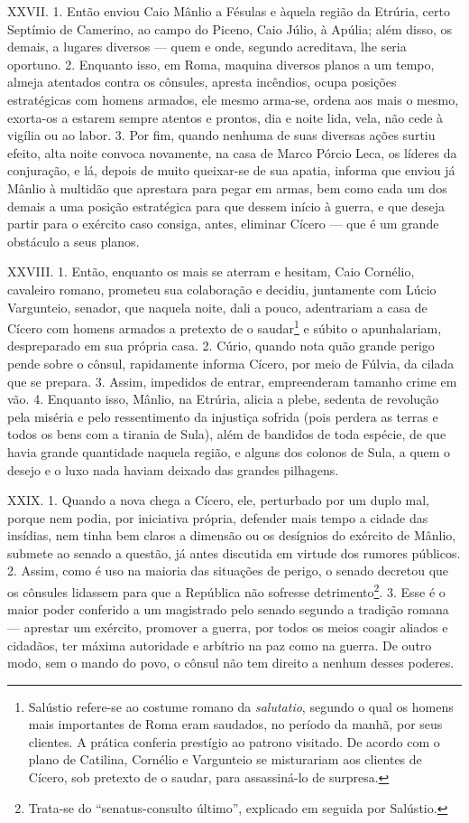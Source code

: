 XXVII. 1. Então enviou Caio Mânlio a Fésulas e àquela região da Etrúria, certo
Septímio de Camerino, ao campo do Piceno, Caio Júlio, à Apúlia; além disso, os
demais, a lugares diversos --- quem e onde, segundo acreditava, lhe seria
oportuno. 2. Enquanto isso, em Roma, maquina diversos planos a um tempo, almeja
atentados contra os cônsules, apresta incêndios, ocupa posições estratégicas
com homens armados, ele mesmo arma-se, ordena aos mais o mesmo, exorta-os a
estarem sempre atentos e prontos, dia e noite lida, vela, não cede à vigília ou
ao labor. 3. Por fim, quando nenhuma de suas diversas ações surtiu efeito, alta
noite convoca novamente, na casa de Marco Pórcio Leca, os líderes da
conjuração, e lá, depois de muito queixar-se de sua apatia, informa que enviou
já Mânlio à multidão que aprestara para pegar em armas, bem como cada um dos
demais a uma posição estratégica para que dessem início à guerra, e que deseja
partir para o exército caso consiga, antes, eliminar Cícero --- que  é um
grande obstáculo a seus planos.

XXVIII. 1. Então, enquanto os mais se aterram e hesitam, Caio Cornélio,
cavaleiro romano, prometeu sua colaboração e decidiu, juntamente com Lúcio
Vargunteio, senador, que naquela noite, dali a pouco, adentrariam a casa de
Cícero com homens armados a pretexto de o saudar\footnote{Salústio refere-se ao
costume romano da \emph{salutatio}, segundo o qual os homens mais importantes
de Roma eram saudados, no período da manhã, por seus clientes. A prática
conferia prestígio ao patrono visitado. De acordo com o plano de Catilina,
Cornélio e Vargunteio se misturariam aos clientes de Cícero, sob pretexto de o
saudar, para assassiná-lo de surpresa.} e súbito o apunhalariam, despreparado
em sua própria casa. 2. Cúrio, quando nota quão grande perigo pende sobre o
cônsul, rapidamente informa Cícero, por meio de Fúlvia, da cilada que se
prepara. 3. Assim, impedidos de entrar, empreenderam tamanho crime em vão. 4.
Enquanto isso, Mânlio, na Etrúria, alicia a plebe, sedenta de revolução pela
miséria e pelo ressentimento da injustiça sofrida (pois perdera as terras e
todos os bens com a tirania de Sula), além de bandidos de toda espécie, de que
havia grande quantidade naquela região, e alguns dos colonos de Sula, a quem o
desejo e o luxo nada haviam deixado das grandes pilhagens.

XXIX. 1. Quando a nova chega a Cícero, ele, perturbado por um duplo mal, porque
nem podia, por iniciativa própria, defender mais tempo a cidade das insídias,
nem tinha bem claros a dimensão ou os desígnios do exército de Mânlio, submete
ao senado a questão, já antes discutida em virtude dos rumores públicos. 2.
Assim, como é uso na maioria das situações de perigo, o senado decretou que os
cônsules lidassem para que a República não sofresse
detrimento\footnote{Trata-se do 
``senatus-consulto último'', explicado em seguida por Salústio.}. 3. Esse é o
maior poder conferido a um magistrado pelo senado segundo a tradição romana ---
aprestar um exército, promover a guerra, por todos os meios coagir aliados e
cidadãos, ter máxima autoridade e arbítrio na paz como na guerra. De outro
modo, sem o mando do povo, o cônsul não tem direito a nenhum desses poderes. 

